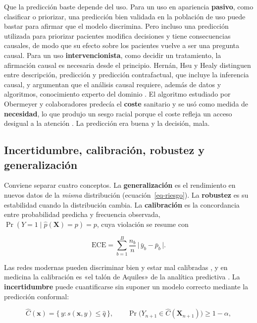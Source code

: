 \documentclass[11pt,a4paper]{article}
\begin{document}
Que la predicción baste depende del uso. Para un uso en apariencia \textbf{pasivo}, como clasificar o priorizar, una predicción bien validada en la población de uso puede bastar para afirmar que el modelo discrimina. Pero incluso una predicción utilizada para priorizar pacientes modifica decisiones y tiene consecuencias causales, de modo que su efecto sobre los pacientes vuelve a ser una pregunta causal. Para un uso \textbf{intervencionista}, como decidir un tratamiento, la afirmación causal es necesaria desde el principio. Hernán, Hsu y Healy distinguen entre descripción, predicción y predicción contrafactual, que incluye la inferencia causal, y argumentan que el análisis causal requiere, además de datos y algoritmos, conocimiento experto del dominio \autocite{hernan2019}. El algoritmo estudiado por Obermeyer y colaboradores predecía el \textbf{coste} sanitario y se usó como medida de \textbf{necesidad}, lo que produjo un sesgo racial porque el coste refleja un acceso desigual a la atención \autocite{obermeyer2019}. La predicción era buena y la decisión, mala.

\subsection{Incertidumbre, calibración, robustez y generalización}

Conviene separar cuatro conceptos. La \textbf{generalización} es el rendimiento en nuevos datos de la \emph{misma} distribución (ecuación~\eqref{eq-riesgo}). La \textbf{robustez} es su estabilidad cuando la distribución cambia. La \textbf{calibración} es la concordancia entre probabilidad predicha y frecuencia observada, \(\Pr(Y=1 \mid \hat p(\mathbf{X})=p)=p\), cuya violación se resume con

\begin{equation}\label{eq-ece}
\mathrm{ECE} = \sum_{b=1}^{B} \frac{n_b}{n}\,\big|\,\bar y_b - \bar p_b\,\big|.
\end{equation}

Las redes modernas pueden discriminar bien y estar mal calibradas \autocite{guo2017}, y en medicina la calibración es «el talón de Aquiles» de la analítica predictiva \autocite{vancalster2019}. La \textbf{incertidumbre} puede cuantificarse sin suponer un modelo correcto mediante la predicción conformal:

\begin{equation}\label{eq-conformal}
\widehat{C}(\mathbf{x}) = \{\, y : s(\mathbf{x}, y) \le \hat q \,\},
\qquad
\Pr\big(Y_{n+1} \in \widehat{C}(\mathbf{X}_{n+1})\big) \ge 1-\alpha,
\end{equation}
\end{document}
